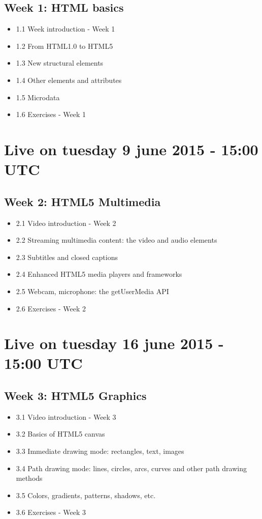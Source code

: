 \documentclass[a4paper,11pt]{book}
\begin{document}
    \subsection{Week 1: HTML basics}
    \begin{itemize}
        \item 1.1 Week introduction - Week 1
        \item 1.2 From HTML1.0 to HTML5
        \item 1.3 New structural elements
        \item 1.4 Other elements and attributes
        \item 1.5 Microdata
        \item 1.6 Exercises - Week 1
    \end{itemize}

\section{Live on tuesday 9 june 2015 - 15:00 UTC}
    \subsection{Week 2: HTML5 Multimedia}
    \begin{itemize}
        \item 2.1 Video introduction - Week 2
        \item 2.2 Streaming multimedia content: the video and audio elements
        \item 2.3 Subtitles and closed captions
        \item 2.4 Enhanced HTML5 media players and frameworks
        \item 2.5 Webcam, microphone: the getUserMedia API
        \item 2.6 Exercises - Week 2
    \end{itemize}

\section{Live on tuesday 16 june 2015 - 15:00 UTC}
    \subsection{Week 3: HTML5 Graphics}
    \begin{itemize}
        \item 3.1 Video introduction - Week 3
        \item 3.2 Basics of HTML5 canvas
        \item 3.3 Immediate drawing mode: rectangles, text, images
        \item 3.4 Path drawing mode: lines, circles, arcs, curves and other path drawing methods
        \item 3.5 Colors, gradients, patterns, shadows, etc.
        \item 3.6 Exercises - Week 3
    \end{itemize}
\end{document}
